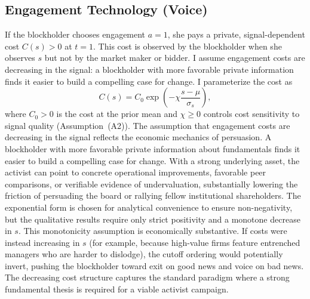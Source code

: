 \documentclass[11pt]{article}
\newcommand{\1}{\mathbf{1}}
\begin{document}
%
\subsection{Engagement Technology (Voice)}
\label{sec:engagement}
%

If the blockholder chooses engagement $a = 1$, she pays a private, signal-dependent cost $C(s) > 0$ at $t = 1$. This cost is observed by the blockholder when she observes $s$ but not by the market maker or bidder. I assume engagement costs are decreasing in the signal: a blockholder with more favorable private information finds it easier to build a compelling case for change. I parameterize the cost as
\[
C(s) = C_0 \exp\!\left(-\chi \frac{s - \mu}{\sigma_s}\right),
\]
where $C_0 > 0$ is the cost at the prior mean and $\chi \geq 0$ controls cost sensitivity to signal quality (Assumption~\textup{(A2)}). The assumption that engagement costs are decreasing in the signal reflects the economic mechanics of persuasion. A blockholder with more favorable private information about fundamentals finds it easier to build a compelling case for change. With a strong underlying asset, the activist can point to concrete operational improvements, favorable peer comparisons, or verifiable evidence of undervaluation, substantially lowering the friction of persuading the board or rallying fellow institutional shareholders. The exponential form is chosen for analytical convenience to ensure non-negativity, but the qualitative results require only strict positivity and a monotone decrease in $s$. This monotonicity assumption is economically substantive. If costs were instead increasing in $s$ (for example, because high-value firms feature entrenched managers who are harder to dislodge), the cutoff ordering would potentially invert, pushing the blockholder toward exit on good news and voice on bad news. The decreasing cost structure captures the standard paradigm where a strong fundamental thesis is required for a viable activist campaign.
\end{document}

